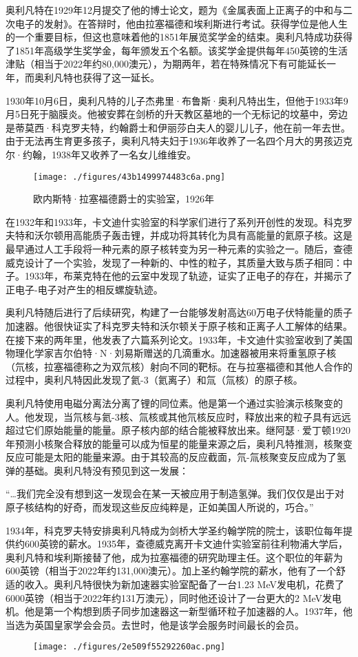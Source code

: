 奥利凡特在1929年12月提交了他的博士论文，题为《金属表面上正离子的中和与二次电子的发射》。在答辩时，他由拉塞福德和埃利斯进行考试。获得学位是他人生的一个重要目标，但这也意味着他的1851年展览奖学金的结束。奥利凡特成功获得了1851年高级学生奖学金，每年颁发五个名额。该奖学金提供每年450英镑的生活津贴（相当于2022年约80,000澳元），为期两年，若在特殊情况下有可能延长一年，而奥利凡特也获得了这一延长。

1930年10月6日，奥利凡特的儿子杰弗里·布鲁斯·奥利凡特出生，但他于1933年9月5日死于脑膜炎。他被安葬在剑桥的升天教区墓地的一个无标记的坟墓中，旁边是蒂莫西·科克罗夫特，约翰爵士和伊丽莎白夫人的婴儿儿子，他在前一年去世。由于无法再生育更多孩子，奥利凡特夫妇于1936年收养了一名四个月大的男孩迈克尔·约翰，1938年又收养了一名女儿维维安。
\begin{figure}[ht]
\centering
\texttt{[image: ./figures/43b1499974483c6a.png]}
\caption{欧内斯特·拉塞福德爵士的实验室，1926年} \label{fig_MKalft_3}
\end{figure}
在1932年和1933年，卡文迪什实验室的科学家们进行了系列开创性的发现。科克罗夫特和沃尔顿用高能质子轰击锂，并成功将其转化为具有高能量的氦原子核。这是最早通过人工手段将一种元素的原子核转变为另一种元素的实验之一。随后，查德威克设计了一个实验，发现了一种新的、中性的粒子，其质量大致与质子相同：中子。1933年，布莱克特在他的云室中发现了轨迹，证实了正电子的存在，并揭示了正电子-电子对产生的相反螺旋轨迹。

奥利凡特随后进行了后续研究，构建了一台能够发射高达60万电子伏特能量的质子加速器。他很快证实了科克罗夫特和沃尔顿关于原子核和正离子人工解体的结果。在接下来的两年里，他发表了六篇系列论文。1933年，卡文迪什实验室收到了美国物理化学家吉尔伯特·N·刘易斯赠送的几滴重水。加速器被用来将重氢原子核（氘核，拉塞福德称之为双氘核）射向不同的靶标。在与拉塞福德和其他人合作的过程中，奥利凡特因此发现了氦-3（氦离子）和氚（氚核）的原子核。

奥利凡特使用电磁分离法分离了锂的同位素。他是第一个通过实验演示核聚变的人。他发现，当氘核与氦-3核、氚核或其他氘核反应时，释放出来的粒子具有远远超过它们原始能量的能量。原子核内部的结合能被释放出来。继阿瑟·爱丁顿1920年预测小核聚合释放的能量可以成为恒星的能量来源之后，奥利凡特推测，核聚变反应可能是太阳的能量来源。由于其较高的反应截面，氘-氚核聚变反应成为了氢弹的基础。奥利凡特没有预见到这一发展：

“…我们完全没有想到这一发现会在某一天被应用于制造氢弹。我们仅仅是出于对原子核结构的好奇，而发现这些反应纯粹是，正如美国人所说的，巧合。”

1934年，科克罗夫特安排奥利凡特成为剑桥大学圣约翰学院的院士，该职位每年提供约600英镑的薪水。1935年，查德威克离开卡文迪什实验室前往利物浦大学后，奥利凡特和埃利斯接替了他，成为拉塞福德的研究助理主任。这个职位的年薪为600英镑（相当于2022年约131,000澳元）。加上圣约翰学院的薪水，他有了一个舒适的收入。奥利凡特很快为新加速器实验室配备了一台1.23 MeV发电机，花费了6000英镑（相当于2022年约131万澳元），同时他还设计了一台更大的2 MeV发电机。他是第一个构想到质子同步加速器这一新型循环粒子加速器的人。1937年，他当选为英国皇家学会会员。去世时，他是该学会服务时间最长的会员。

\begin{figure}[ht]
\centering
\texttt{[image: ./figures/2e509f55292260ac.png]}
\caption{} \label{fig_MKalft_4}
\end{figure}